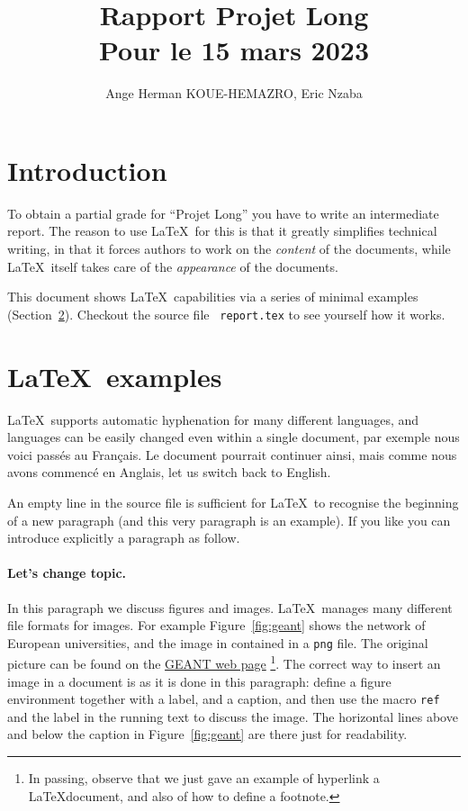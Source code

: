 \documentclass{article}
\title{Rapport Projet Long\\ Pour le 15 mars 2023}
\author{Ange Herman KOUE-HEMAZRO, Eric Nzaba}
\newcommand{\latex}{\LaTeX}
\begin{document}
\maketitle


\section{Introduction}
To obtain a partial grade for \foreignlanguage{french}{``Projet Long''}
you have to write an intermediate report.
The reason to use \latex\ for this is that it greatly simplifies technical writing,
in that it forces authors to work on the {\em content} of the documents,
while \latex\  itself takes care of the {\em appearance} of the documents.

This document shows \latex\  capabilities via a series of minimal
examples (Section~\ref{sec:latex-examples}). Checkout the source file {\tt
  report.tex} to see yourself how it works.

\section{\latex\  examples}
\label{sec:latex-examples}
\latex\  supports automatic hyphenation for many different languages,
and languages can be easily changed even within a single document,
par exemple nous voici passés au Français. Le document pourrait continuer ainsi,
mais comme nous avons commencé en Anglais,
let us switch back to English.

An empty line in the source file is sufficient for \latex\  to
recognise the beginning of a new paragraph (and this very
paragraph is an example). If you like you can introduce explicitly
a paragraph as follow.

\paragraph{Let's change topic.} In this paragraph we discuss figures
and images. \latex\  manages many different file formats for images.
For example Figure~\ref{fig:geant} shows the network of European universities,
and the image in contained in a {\tt png} file.
The original picture can be found on the \href{https://www.geant.org/}{GEANT web page}
\footnote{In passing, observe that we just gave an example of hyperlink a
\latex document, and also of how to define a footnote.}.
The correct way to insert an image in a document is as it is done in this
paragraph: define a figure environment together with a label, and a caption,
and then use the macro {\tt ref} and the label in the running text
to discuss the image. The horizontal lines above and below the caption in
Figure~\ref{fig:geant} are there just for readability.
\end{document}
